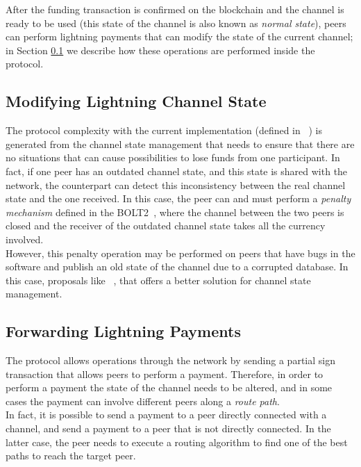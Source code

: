 After the funding transaction is confirmed on the blockchain and the channel is ready to be used (this state of the channel is also known as \emph{normal state}),
peers can perform lightning payments that can modify the state of the current channel; in Section \ref{sec:modify_channel_state} we describe how these operations are performed inside the protocol.

\subsection{Modifying Lightning Channel State}\label{sec:modify_channel_state}

The {\LN} protocol complexity with the current implementation (defined in ~\cite{lightning-bolts})
is generated from the channel state management that needs to ensure that there are no situations that can
cause  possibilities to lose funds from one participant.
In fact, if one peer has an outdated channel state, and this state is shared with the network, the counterpart can
detect this inconsistency between the real channel state and the one received. In this case, the peer can and must
perform  a \emph{penalty mechanism} defined in the BOLT2~\cite{bolt2}, where the channel between the two peers
is closed and the receiver of the outdated channel state takes all the currency involved.\\
However, this penalty operation may be performed on peers that have bugs in the software and publish an old state of the
channel due to a corrupted database. In this case, proposals like  ~\cite{eltoo},
that offers a better solution for channel state management.

\subsection{Forwarding Lightning Payments}
\label{sec:lightning_forwarding}

The {\LN} protocol allows operations through the network by sending a partial sign transaction that
allows peers to perform a payment.
Therefore, in order to perform a payment the state of the channel needs to be altered, and in some cases the payment can involve
different peers along a \emph{route path}.\\
In fact, it is possible to send a payment to a peer directly connected with a channel, and send a payment to a peer
that is not directly connected. In the latter case, the peer needs to execute a routing algorithm
to find one of the best paths to reach the target peer.

